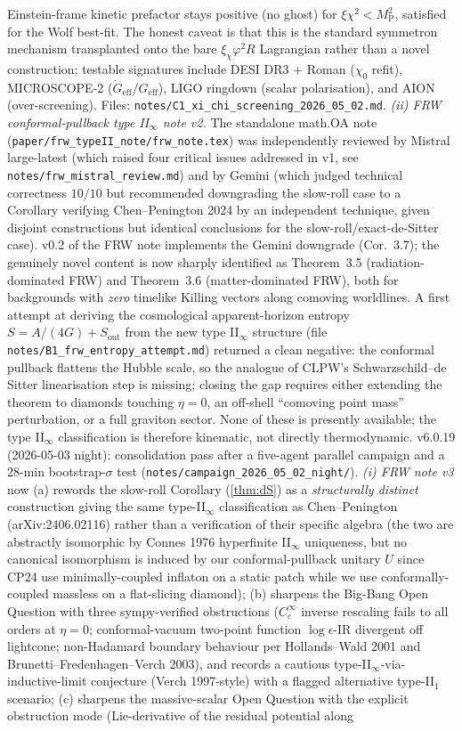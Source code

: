 \documentclass[reprint,amsmath,amssymb,aps,prd,superscriptaddress]{revtex4-2}
\providecommand{\1}{\mathbf{1}}
\begin{document}
Einstein-frame kinetic prefactor stays positive (no ghost) for $\xi\chi^2 < M_\mathrm{P}^2$, satisfied for the Wolf best-fit. The honest caveat is that this is the standard symmetron mechanism transplanted onto the bare $\xi_\chi\varphi^2 R$ Lagrangian rather than a novel construction; testable signatures include DESI DR3 + Roman ($\chi_0$ refit), MICROSCOPE-2 ($\dot G_\mathrm{eff}/G_\mathrm{eff}$), LIGO ringdown (scalar polarisation), and AION (over-screening). Files: \texttt{notes/C1\_xi\_chi\_screening\_2026\_05\_02.md}. \emph{(ii) FRW conformal-pullback type II$_\infty$ note v2.} The standalone math.OA note (\texttt{paper/frw\_typeII\_note/frw\_note.tex}) was independently reviewed by Mistral large-latest (which raised four critical issues addressed in v1, see \texttt{notes/frw\_mistral\_review.md}) and by Gemini (which judged technical correctness $10/10$ but recommended downgrading the slow-roll case to a Corollary verifying Chen--Penington 2024 by an independent technique, given disjoint constructions but identical conclusions for the slow-roll/exact-de-Sitter case). v0.2 of the FRW note implements the Gemini downgrade (Cor.~3.7); the genuinely novel content is now sharply identified as Theorem~3.5 (radiation-dominated FRW) and Theorem~3.6 (matter-dominated FRW), both for backgrounds with \emph{zero} timelike Killing vectors along comoving worldlines. A first attempt at deriving the cosmological apparent-horizon entropy $S = A/(4G) + S_\mathrm{out}$ from the new type II$_\infty$ structure (file \texttt{notes/B1\_frw\_entropy\_attempt.md}) returned a clean negative: the conformal pullback flattens the Hubble scale, so the analogue of CLPW's Schwarzschild--de Sitter linearisation step is missing; closing the gap requires either extending the theorem to diamonds touching $\eta=0$, an off-shell ``comoving point mass'' perturbation, or a full graviton sector. None of these is presently available; the type II$_\infty$ classification is therefore kinematic, not directly thermodynamic. v6.0.19 (2026-05-03 night): consolidation pass after a five-agent parallel campaign and a 28-min bootstrap-$\sigma$ test (\texttt{notes/campaign\_2026\_05\_02\_night/}). \emph{(i) FRW note v3} now (a) rewords the slow-roll Corollary (\ref{thm:dS}) as a \emph{structurally distinct} construction giving the same type-II$_\infty$ classification as Chen--Penington (arXiv:2406.02116) rather than a verification of their specific algebra (the two are abstractly isomorphic by Connes 1976 hyperfinite II$_\infty$ uniqueness, but no canonical isomorphism is induced by our conformal-pullback unitary $U$ since CP24 use minimally-coupled inflaton on a static patch while we use conformally-coupled massless on a flat-slicing diamond); (b) sharpens the Big-Bang Open Question with three sympy-verified obstructions ($C_c^\infty$ inverse rescaling fails to all orders at $\eta=0$; conformal-vacuum two-point function $\log\epsilon$-IR divergent off lightcone; non-Hadamard boundary behaviour per Hollands--Wald 2001 and Brunetti--Fredenhagen--Verch 2003), and records a cautious type-II$_\infty$-via-inductive-limit conjecture (Verch 1997-style) with a flagged alternative type-II$_1$ scenario; (c) sharpens the massive-scalar Open Question with the explicit obstruction mode (Lie-derivative of the residual potential along 
\end{document}
